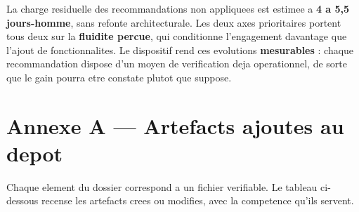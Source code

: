 La charge residuelle des recommandations non appliquees est estimee a \textbf{4 a 5,5 jours-homme},
sans refonte architecturale. Les deux axes prioritaires portent tous deux sur la \textbf{fluidite
percue}, qui conditionne l'engagement davantage que l'ajout de fonctionnalites. Le dispositif rend
ces evolutions \textbf{mesurables} : chaque recommandation dispose d'un moyen de verification deja
operationnel, de sorte que le gain pourra etre constate plutot que suppose.

\section{Annexe A --- Artefacts ajoutes au depot}

Chaque element du dossier correspond a un fichier verifiable. Le tableau ci-dessous recense les
artefacts crees ou modifies, avec la competence qu'ils servent.

